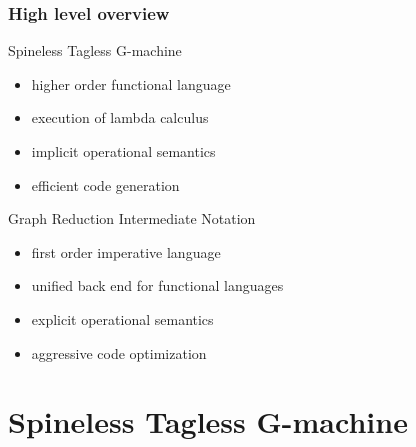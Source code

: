 \documentclass[bigger,aspectratio=169]{beamer}
\begin{document}
\begin{frame}[fragile]
\frametitle{High level overview}

\begin{minipage}{0.4\textwidth}
	\begin{center}
		Spineless Tagless G-machine
	\end{center}
	\begin{itemize}
		\item<2-> higher order functional language
		\item<3-> execution of lambda calculus
		\item<4-> implicit operational semantics
		\item<5-> efficient code generation
	\end{itemize}
\end{minipage}
\hfill
\begin{minipage}{0.4\textwidth}
	\begin{center}
		Graph Reduction Intermediate Notation
	\end{center}
	\begin{itemize}
		\item<6-> first order imperative language
		\item<7-> unified back end for functional languages
		\item<8-> explicit operational semantics
		\item<9-> aggressive code optimization 
	\end{itemize}
\end{minipage}

\end{frame}

\section{Spineless Tagless G-machine}
\end{document}
